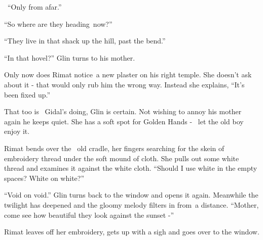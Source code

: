 \documentclass[letterpaper]{article}
\begin{document}
\textcolor[rgb]{0.13333334,0.13333334,0.13333334}{~``Only from afar.''}

\textcolor[rgb]{0.13333334,0.13333334,0.13333334}{{}``So where are they heading~now?''}

\textcolor[rgb]{0.13333334,0.13333334,0.13333334}{{}``They live in that shack up the hill,
}past\textcolor[rgb]{0.13333334,0.13333334,0.13333334}{ the bend.''}

\textcolor[rgb]{0.13333334,0.13333334,0.13333334}{{}``In that hovel?'' Glin turns }to his
mother\textcolor[rgb]{0.13333334,0.13333334,0.13333334}{.}

\textcolor[rgb]{0.13333334,0.13333334,0.13333334}{Only now does Rimat notice~a new }plaster
\textcolor[rgb]{0.13333334,0.13333334,0.13333334}{on his right temple. She doesn't ask about
it}\textcolor[rgb]{0.0,0.1254902,0.3764706}{ }{}- that would only rub him the wrong
way\textcolor[rgb]{0.13333334,0.13333334,0.13333334}{. Instead she explains, ``It's been fixed up.''}

\textcolor[rgb]{0.13333334,0.13333334,0.13333334}{That too is \ Gidal's doing, Glin is certain. Not wishing to annoy his
}mother\textcolor[rgb]{0.13333334,0.13333334,0.13333334}{ again he keeps quiet. She has a soft spot for Golden Hands -
\ let the }old boy \textcolor[rgb]{0.13333334,0.13333334,0.13333334}{enjoy it.}

\textcolor[rgb]{0.13333334,0.13333334,0.13333334}{Rimat bends over the \ old cradle, her fingers searching for the
}skein \textcolor[rgb]{0.13333334,0.13333334,0.13333334}{of embroidery thread under the soft mound of cloth. She pulls
}out some \textcolor[rgb]{0.13333334,0.13333334,0.13333334}{white thread and examines it against the white cloth.
``Should I use white in the }empty\textcolor[rgb]{0.13333334,0.13333334,0.13333334}{ spaces? White on white?''}

\textcolor[rgb]{0.13333334,0.13333334,0.13333334}{{}``Void on void.'' Glin
}turns\textcolor[rgb]{0.13333334,0.13333334,0.13333334}{ back to the window and opens it again. Meanwhile the twilight
has deepened and the gloomy melody filters in from~a distance. ``Mother, come see how beautiful they look against the
sunset -''}

\textcolor[rgb]{0.13333334,0.13333334,0.13333334}{Rimat leaves off her embroidery, gets up with a sigh and goes over to
the window. }
\end{document}
